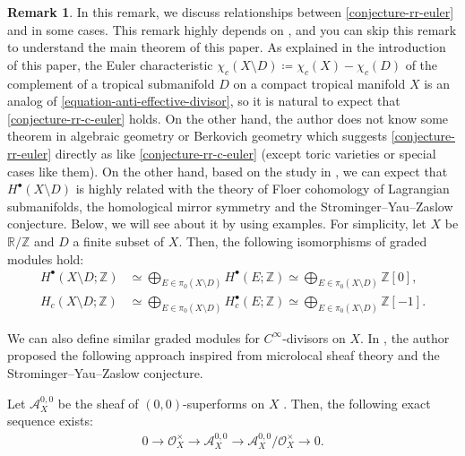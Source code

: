 \documentclass[a4paper,dvipdfmx,reqno,12pt]{amsart}
\theoremstyle{definition}
\newtheorem{remark}[theorem]{Remark}
\newcommand{\deq}{\coloneqq}
\numberwithin{equation}{section}
\begin{document}
\begin{remark}
\label{remark-c-infinity-divisor}
In this remark, we discuss relationships
between \cref{conjecture-rr-euler} and 
\cite{tsutsui2023graded} in some cases.
This remark highly depends on
\cite{tsutsui2023graded}, and you can
skip this remark to understand the main theorem of  
this paper. As explained in the introduction of this paper,
the Euler characteristic 
$\chi_c(X\setminus D)\deq \chi_c(X)-\chi_c(D)$ of 
the complement of a tropical submanifold $D$ on
a compact tropical manifold $X$ is an analog of  
\cref{equation-anti-effective-divisor}, so 
it is natural to expect that \cref{conjecture-rr-c-euler} holds.
On the other hand, the author does not know some theorem
in algebraic geometry or Berkovich geometry
which suggests \cref{conjecture-rr-euler} directly
as like \cref{conjecture-rr-c-euler}
(except toric varieties or special cases like them).
On the other hand, based on the study in \cite{tsutsui2023graded},
we can expect that 
$H^{\bullet}(X\setminus D)$ is highly related with
the theory of Floer cohomology of
Lagrangian submanifolds, the homological mirror symmetry
and the Strominger--Yau--Zaslow conjecture.
Below, we will see about it by using examples. 
For simplicity, let 
$X$ be $\mathbb{R}/\mathbb{Z}$ and $D$ a finite subset of
$X$. Then, the following isomorphisms of graded modules hold:
\begin{align}
H^{\bullet}(X\setminus D;\mathbb{Z}) 
&\simeq \bigoplus_{E\in \pi_0(X\setminus D)} 
H^{\bullet}(E;\mathbb{Z})
\simeq \bigoplus_{E\in \pi_0(X\setminus D)} \mathbb{Z}[0], \\
H_c(X\setminus D;\mathbb{Z}) 
&\simeq \bigoplus_{E\in \pi_0(X\setminus D)} 
H^{\bullet}_c(E;\mathbb{Z})
\simeq \bigoplus_{E\in \pi_0(X\setminus D)} \mathbb{Z}[-1].
\end{align}

We can also define similar graded modules
for $C^{\infty}$-divisors on $X$.
In \cite{tsutsui2023graded},
the author proposed the following approach
inspired from microlocal sheaf theory and
the Strominger--Yau--Zaslow conjecture.

Let $\mathcal{A}^{0,0}_X$ be the sheaf of
$(0,0)$-superforms on $X$
\cite[Definition 2.24]{MR3903579}.
Then, the following exact sequence exists:
\begin{align}
0\to \mathcal{O}_X^{\times} \to \mathcal{A}^{0,0}_X
\to \mathcal{A}^{0,0}_X/\mathcal{O}_X^{\times} \to 0.
\end{align}


\end{remark}
\end{document}
